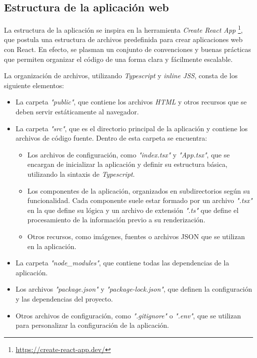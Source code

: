 \subsection{Estructura de la aplicación web}

La estructura de la aplicación se inspira en la herramienta \textit{Create React App} \footnote{\url{https://create-react-app.dev/}}, que postula una estructura de archivos predefinida para crear aplicaciones web con React. En efecto, se plasman un conjunto de convenciones y buenas prácticas que permiten organizar el código de una forma clara y fácilmente escalable.

La organización de archivos, utilizando \textit{Typescript} y \textit{inline JSS}, consta de los siguiente elementos:

\begin{itemize}

  \item La carpeta \textit{"public"}, que contiene los archivos \textit{HTML} y otros recursos que se deben servir estáticamente al navegador.

  \item La carpeta \textit{"src"}, que es el directorio principal de la aplicación y contiene los archivos de código fuente. Dentro de esta carpeta se encuentra:

    \begin{itemize}

      \item Los archivos de configuración, como \textit{"index.tsx"} y \textit{"App.tsx"}, que se encargan de inicializar la aplicación y definir su estructura básica, utilizando la sintaxis de \textit{Typescript}.
  
      \item Los componentes de la aplicación, organizados en subdirectorios según su funcionalidad. Cada componente suele estar formado por un archivo \textit{".tsx"} en la que define su lógica y un archivo de extensión \textit{".ts"} que define el procesamiento de la información previo a su renderización.

      \item Otros recursos, como imágenes, fuentes o archivos JSON que se utilizan en la aplicación.

    \end{itemize}

  \item La carpeta \textit{"node\_modules"}, que contiene todas las dependencias de la aplicación.

  \item Los archivos \textit{"package.json"} y \textit{"package-lock.json"}, que definen la configuración y las dependencias del proyecto.

  \item Otros archivos de configuración, como \textit{".gitignore"} o \textit{".env"}, que se utilizan para personalizar la configuración de la aplicación.

\end{itemize}


